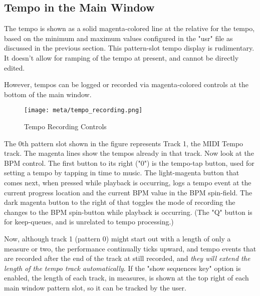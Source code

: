\subsection{Tempo in the Main Window}
\label{subsec:meta_events_mainwid}

%
%

The tempo is shown as a solid magenta-colored line at the relative for the tempo,
based on the minimum and maximum values configured in the "usr" file as
discussed in the previous section.
This pattern-slot tempo display is rudimentary.  It doesn't allow for ramping
of the tempo at present, and cannot be directly edited.

However, tempos can be logged or recorded via magenta-colored controls at the
bottom of the main window.

\begin{figure}[H]
   \centering 
   \texttt{[image: meta/tempo\_recording.png]}
   \caption{Tempo Recording Controls}
   \label{fig:meta_events_mainwid_tempo_recording}
\end{figure}

The 0th pattern slot shown in the figure represents Track 1, the
MIDI Tempo track.  The magenta lines show the tempos already in that track.
Now look at the BPM control.  The first button to its right ("0") is the
tempo-tap button, used for setting a tempo by tapping in time to music.
The light-magenta button that comes next, when pressed while playback is
occurring, logs a tempo event at the current progress location and the
current BPM value in the BPM spin-field.  The dark magenta button to the right
of that toggles the mode of recording the changes to the BPM spin-button while
playback is occurring.  (The "Q" button is for keep-queues, and is unrelated to
tempo processing.)

Now, although track 1 (pattern 0) might start out with a length of only a
measure or two, the performance continually ticks upward, and tempo events that
are recorded after the end of the track at still recorded, and
\textsl{they will extend the length of the tempo track automatically}.
If the "show sequences key" option is enabled, the length of each track, in
measures, is shown at the top right of each main window pattern slot, so it can
be tracked by the user.

